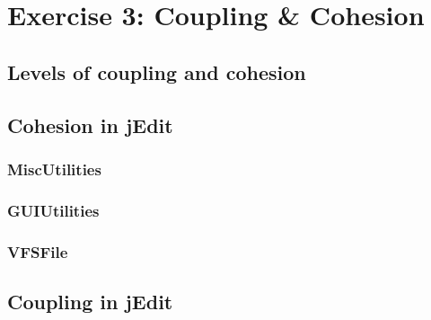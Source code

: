 \section{Exercise 3: Coupling \& Cohesion}

\subsection{Levels of coupling and cohesion}

\subsection{Cohesion in jEdit}

\subsubsection{MiscUtilities}

\subsubsection{GUIUtilities}

\subsubsection{VFSFile}

\subsection{Coupling in jEdit}

\newpage
